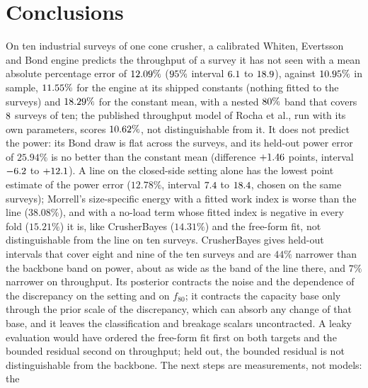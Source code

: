 \begin{table}[!t]
\centering
\caption{SHA-256 digests (first sixteen hexadecimal digits) of the committed artifacts every table and figure of the report is generated from, written by
\texttt{make\_tables.py} together with the full digests.}
\label{tab:hashes}
\footnotesize

\end{table}

\section{Conclusions}\label{sec:conclusions}

On ten industrial surveys of one cone crusher, a calibrated Whiten, Evertsson and Bond engine predicts the throughput of a survey it has not seen with a
mean absolute percentage error of $12.09\%$ ($95\%$ interval $6.1$ to $18.9$), against $10.95\%$ in sample, $11.55\%$
for the engine at its shipped constants (nothing fitted to the surveys) and $18.29\%$ for the constant mean, with a nested $80\%$ band
that covers $8$ surveys of ten; the published throughput model of Rocha et al., run with its own parameters,
scores $10.62\%$, not distinguishable from it. It does not predict the power: its Bond draw is flat across the surveys, and its held-out power
error of $25.94\%$ is no better than the constant mean (difference $+1.46$ points, interval $-6.2$ to $+12.1$). A line on the
closed-side setting alone has the lowest point estimate of the power error ($12.78\%$, interval $7.4$ to $18.4$, chosen on the same
surveys); Morrell's size-specific energy with a fitted work index is worse than the line ($38.08\%$), and with a no-load term whose fitted index is
negative in every fold ($15.21\%$) it is, like CrusherBayes ($14.31\%$) and the free-form fit, not distinguishable from the line on ten surveys.
CrusherBayes gives held-out intervals that cover eight and nine of the ten surveys and are $44\%$ narrower than the backbone band on power, about as
wide as the band of the line there, and $7\%$ narrower on throughput. Its posterior contracts the noise and the dependence of the discrepancy on the
setting and on $f_{80}$; it contracts the capacity base only through the prior scale of the discrepancy, which can absorb any change of that base,
and it leaves the classification and breakage scalars uncontracted. A leaky evaluation would have ordered the free-form fit first on both targets and
the bounded residual second on throughput; held out, the bounded residual is not distinguishable from the backbone. The next steps are measurements, not models: the
